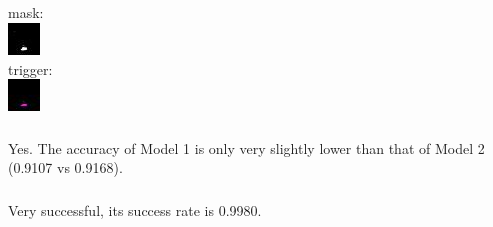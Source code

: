 \documentclass{article}
\begin{document}
\subsection{}
\subsubsection{}
mask: \\
\includegraphics[scale=2]{backdoor-mask.jpeg} \\
trigger: \\
\includegraphics[scale=2]{backdoor-trigger.jpeg}
\subsubsection{}
Yes. The accuracy of Model 1 is only very slightly lower than that of Model 2 (0.9107 vs 0.9168).
\subsubsection{}
Very successful, its success rate is 0.9980.
\end{document}
